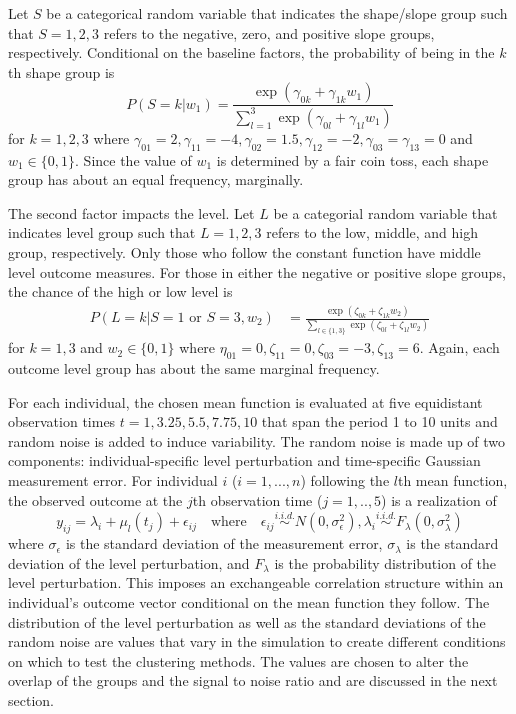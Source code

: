 Let $S$ be a categorical random variable that indicates the shape/slope group such that $S=1,2,3$ refers to the negative, zero, and positive slope groups, respectively. Conditional on the baseline factors, the probability of being in the $k$th shape group is
$$P(S=k |w_{1}) = \frac{\exp(\gamma_{0k}+\gamma_{1k}w_{1})}{\sum^{3}_{l=1} \exp(\gamma_{0l}+\gamma_{1l}w_{1})}$$
for $k=1,2,3$ where $\gamma_{01}=2,\gamma_{11} = -4,\gamma_{02}=1.5,\gamma_{12}=-2,\gamma_{03}=\gamma_{13} = 0$ and $w_{1}\in\{0,1\}$. Since the value of $w_{1}$ is determined by a fair coin toss, each shape group has about an equal frequency, marginally. 

The second factor impacts the level. Let $L$ be a categorial random variable that indicates level group such that $L=1,2,3$ refers to the low, middle, and high group, respectively. Only those who follow the constant function have middle level outcome measures. For those in either the negative or positive slope groups, the chance of the high or low level is
\begin{align*}
P(L=k|S=1 \text{ or } S=3,w_{2}) & = \frac{\exp(\zeta_{0k}+\zeta_{1k} w_{2})}{\sum_{l\in\{1,3\} }\exp(\zeta_{0l}+\zeta_{1l}w_{2})}
\end{align*}
for $k=1,3$ and $w_{2}\in\{0,1\}$ where $\eta_{01}=0,\zeta_{11}=0,\zeta_{03}=-3,\zeta_{13}=6$. Again, each outcome level group has about the same marginal frequency.

For each individual, the chosen mean function is evaluated at five equidistant observation times $t=1,3.25,5.5,7.75,10$ that span the period 1 to 10 units and random noise is added to induce variability. The random noise is made up of two components: individual-specific level perturbation and time-specific Gaussian measurement error. For individual $i$ ($i=1,...,n$)  following the $l$th mean function, the observed outcome at the $j$th observation time ($j=1,..,5$) is a realization of
$$y_{ij} = \lambda_{i}+\mu_{l}(t_{j})+\epsilon_{ij}\quad\text{where}\quad \epsilon_{ij}\stackrel{i.i.d.}{\sim} N(0,\sigma_{\epsilon}^{2}), \lambda_{i}\stackrel{i.i.d.}{\sim} F_{\lambda}(0,\sigma_{\lambda}^{2})$$
where $\sigma_{\epsilon}$  is the standard deviation of the measurement error, $\sigma_{\lambda}$ is the standard deviation of the level perturbation, and $F_{\lambda}$ is the probability distribution of the level perturbation. This imposes an exchangeable correlation structure within an individual's outcome vector conditional on the mean function they follow. The distribution of the level perturbation as well as the standard deviations of the random noise are values that vary in the simulation to create different conditions on which to test the clustering methods. The values are chosen to alter the overlap of the groups and the signal to noise ratio and are discussed in the next section.


